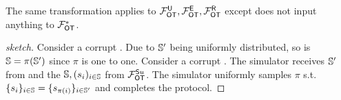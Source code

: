 \begin{remark}
	The same transformation applies to $\mathcal{F}_{\mathsf{OT}}^\mathsf{U},\mathcal{F}_{\mathsf{OT}}^\mathsf{E}, \mathcal{F}_{\mathsf{OT}}^\mathsf{R}$ except \send does not input anything to $\mathcal{F}_{\mathsf{OT}}^*$.
\end{remark}
 

\begin{proof}[sketch]
	Consider a corrupt \send. Due to $\mathsf{\mathbb S}'$ being uniformly distributed, so is $\mathsf{\mathbb S}=\pi(\mathsf{\mathbb S}')$ since $\pi$ is one to one. Consider a corrupt \rec. The simulator receives $\mathsf{\mathbb S}'$ from \rec and the $\mathsf{\mathbb S},(s_i)_{i\in\mathsf{\mathbb S}}$ from $\mathcal{F}_{\mathsf{OT}}^{\mathsf{S} u}$. The simulator uniformly samples $\pi$ s.t. $\{s_i\}_{i\in\mathsf{\mathbb S}} =\{s_{\pi(i)}\}_{i\in\mathsf{\mathbb S}'}$ and completes the protocol.
	\pe
\end{proof}

%
%
%
%
%
%

